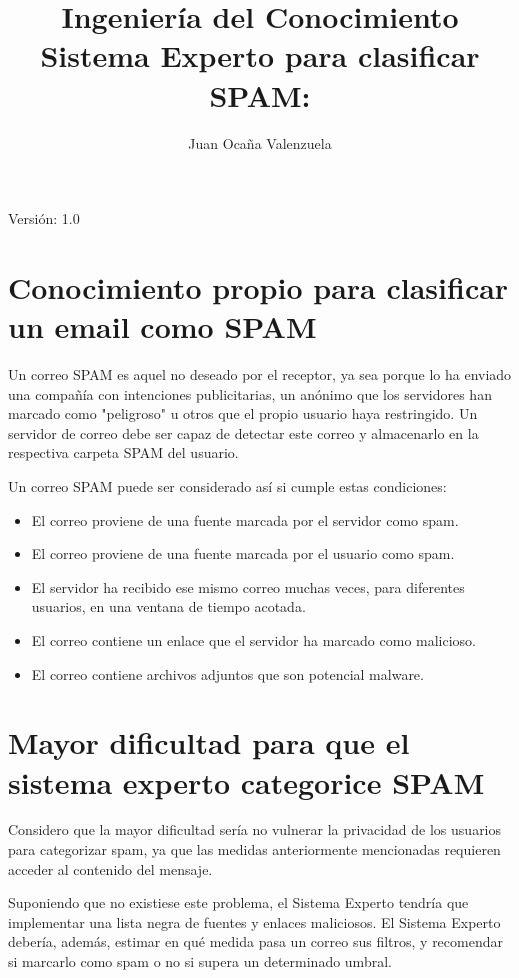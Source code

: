 \documentclass[11pt,a4paper]{article}
\author{Juan Ocaña Valenzuela}
\title{\textbf{Ingeniería del Conocimiento} \\ 
 Sistema Experto para clasificar SPAM: }
\begin{document}
\thispagestyle{empty}

\maketitle

\begin{center}

Versión: 1.0
\end{center}

\newpage

\tableofcontents

\newpage

\section{Conocimiento propio para clasificar un email como SPAM}

Un correo SPAM es aquel no deseado por el receptor, ya sea porque lo ha enviado una 
compañía con intenciones publicitarias, un anónimo que los servidores han marcado como 
"peligroso" u otros que el propio usuario haya restringido. Un servidor de correo debe ser
capaz de detectar este correo y almacenarlo en la respectiva carpeta SPAM del usuario.

Un correo SPAM puede ser considerado así si cumple estas condiciones:

\begin{itemize}
\item El correo proviene de una fuente marcada por el servidor como spam.
\item El correo proviene de una fuente marcada por el usuario como spam.
\item El servidor ha recibido ese mismo correo muchas veces, para diferentes usuarios, en 
una ventana de tiempo acotada.
\item El correo contiene un enlace que el servidor ha marcado como malicioso.
\item El correo contiene archivos adjuntos que son potencial malware.
\end{itemize}

\section{Mayor dificultad para que el sistema experto categorice SPAM}
Considero que la mayor dificultad sería no vulnerar la privacidad de los usuarios para categorizar spam,
ya que las medidas anteriormente mencionadas requieren acceder al contenido del mensaje.

\medskip

Suponiendo que no existiese este problema, el Sistema Experto tendría que implementar
una lista negra de fuentes y enlaces maliciosos. El Sistema Experto debería, además, estimar 
en qué medida pasa un correo sus filtros, y recomendar si marcarlo como spam o no si supera un determinado
umbral.
\end{document}
